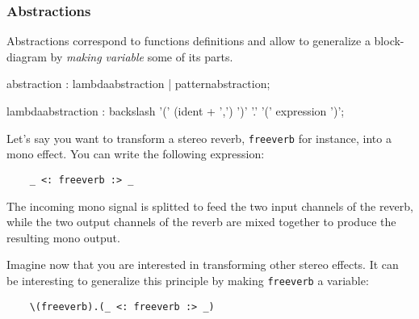 \subsubsection{Abstractions}

Abstractions correspond to functions definitions and allow to generalize a block-diagram by \textit{making variable} some of its parts. 

% 

\begin{rail}
abstraction : lambdaabstraction | patternabstraction; 
\end{rail}

\begin{rail}
lambdaabstraction :  backslash '(' (ident + ',') ')' '.' '(' expression ')';
\end{rail}

Let's say you want to transform a stereo reverb, \lstinline'freeverb' for instance, into a mono effect. You can write the following expression: 
\begin{lstlisting}
	_ <: freeverb :> _ 
\end{lstlisting}
The incoming mono signal is splitted to feed the two input channels of the reverb, while the two output channels of the reverb are mixed together to produce the resulting mono output.

Imagine now that you are interested in transforming other stereo effects. It can be interesting to generalize this principle by making \lstinline'freeverb' a variable: 
\begin{lstlisting}
	\(freeverb).(_ <: freeverb :> _)
\end{lstlisting}

